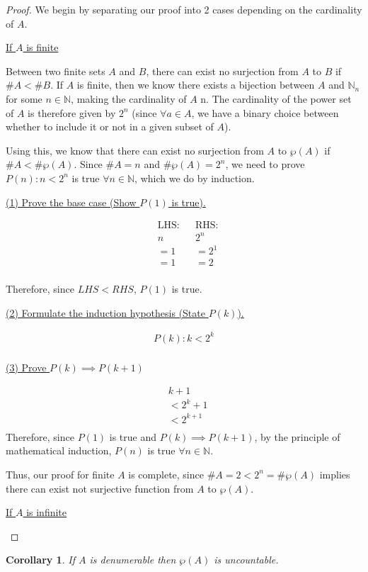 \documentclass{article}
\newtheorem{corollary}{Corollary}[theorem]
\begin{document}
\begin{proof}
	We begin by separating our proof into 2 cases depending on the cardinality of $A$.
	
	\begin{center}
		\large{\underline{If $A$ is finite}}
	\end{center}
	Between two finite sets $A$ and $B$, there can exist no surjection from $A$ to $B$ if $\#A < \#B$.
	If $A$ is finite, then we know there exists a bijection between $A$ and $\mathbb{N}_n$ for some $n \in \mathbb{N}$, making the cardinality of $A$ n. The cardinality of the power set of $A$ is therefore given by $2^n$ (since $\forall a \in A$, we have a binary choice between whether to include it or not in a given subset of $A$).

	Using this, we know that there can exist no surjection from $A$ to $\wp(A)$ if $\#A < \#\wp(A)$. Since $\#A = n$ and $\#\wp(A) = 2^n$, we need to prove $P(n): n < 2^n$ is true $\forall n \in \mathbb{N}$, which we do by induction.

	\begin{center}
		\underline{(1) Prove the base case (Show $P(1)$ is true).}
	\end{center}

	\begin{align*}
		&\text{LHS:}& &\text{RHS:} \\
		&n & &2^n \\
		&=1& &=2^1 \\
		&=1& &=2 \\
	\end{align*}

	Therefore, since $LHS < RHS$, $P(1)$ is true.

	\begin{center}
		\underline{(2) Formulate the induction hypothesis (State $P(k)$).}
	\end{center}
	
	\begin{align*}
		P(k): k < 2^k \\
	\end{align*}

	\begin{center}
		\underline{(3) Prove $P(k) \implies P(k + 1)$}
	\end{center}
	\begin{align*}
		&k + 1 \\
		&<2^{k} + 1 \\
		&<2^{k + 1} \\
	\end{align*}
	Therefore, since $P(1)$ is true and $P(k) \implies P(k + 1)$, by the principle of mathematical induction, $P(n)$ is true $\forall n \in \mathbb{N}$.

	Thus, our proof for finite $A$ is complete, since $\# A = 2 < 2^n = \#\wp(A)$ implies there can exist not surjective function from $A$ to $\wp(A)$.
	\begin{center}
		\underline{If $A$ is infinite}
	\end{center}
\end{proof}

\begin{corollary}
	If $A$ is denumerable then $\wp(A)$ is uncountable.
\end{corollary}
\end{document}
